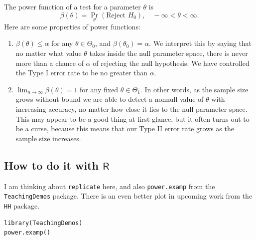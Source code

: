 \documentclass[captions=tableheading]{scrbook}
\begin{document}
The power function of a test for a parameter \(\theta\) is
\[
\beta(\theta)=\Pr_{\theta}(\mbox{Reject }H_{0}),\quad-\infty<\theta<\infty.
\]
Here are some properties of power functions:
\begin{enumerate}
\item \(\beta(\theta)\leq\alpha\) for any \(\theta\in\Theta_{0}\), and \(\beta(\theta_{0})=\alpha\). We interpret this by saying that no matter what value \(\theta\) takes inside the null parameter space, there is never more than a chance of \(\alpha\) of rejecting the null hypothesis. We have controlled the Type I error rate to be no greater than \(\alpha\).
\item \(\lim_{n\to\infty}\beta(\theta)=1\) for any fixed \(\theta\in\Theta_{1}\). In other words, as the sample size grows without bound we are able to detect a nonnull value of \(\theta\) with increasing accuracy, no matter how close it lies to the null parameter space. This may appear to be a good thing at first glance, but it often turns out to be a curse, because this means that our Type II error rate grows as the sample size increases.
\end{enumerate}
\subsection{How to do it with \(\mathsf{R}\)}
\label{sec-10-7-1}


I am thinking about \texttt{replicate} here, and also \texttt{power.examp} from the \texttt{TeachingDemos} package. There is an even better plot in upcoming work from the \texttt{HH} package.


\begin{verbatim}
library(TeachingDemos)
power.examp()
\end{verbatim}
\end{document}
